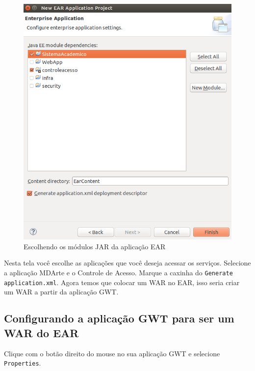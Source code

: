 \begin{figure}[H]
	\centering
	\includegraphics[scale=0.5]{files/imgs/gwt-06.png}
	\caption{Escolhendo os módulos JAR da aplicação EAR}
	\label{gwt06}
\end{figure}

Nesta tela você escolhe as aplicações que você deseja acessar os serviços. Selecione a aplicação MDArte e o Controle de Acesso.
Marque a caxinha do \texttt{Generate application.xml}. Agora temos que colocar um WAR no EAR, isso seria criar um WAR a partir da
aplicação GWT.

\subsection{Configurando a aplicação GWT para ser um WAR do EAR}

Clique com o botão direito do mouse no sua aplicação GWT e selecione \texttt{Properties}.

